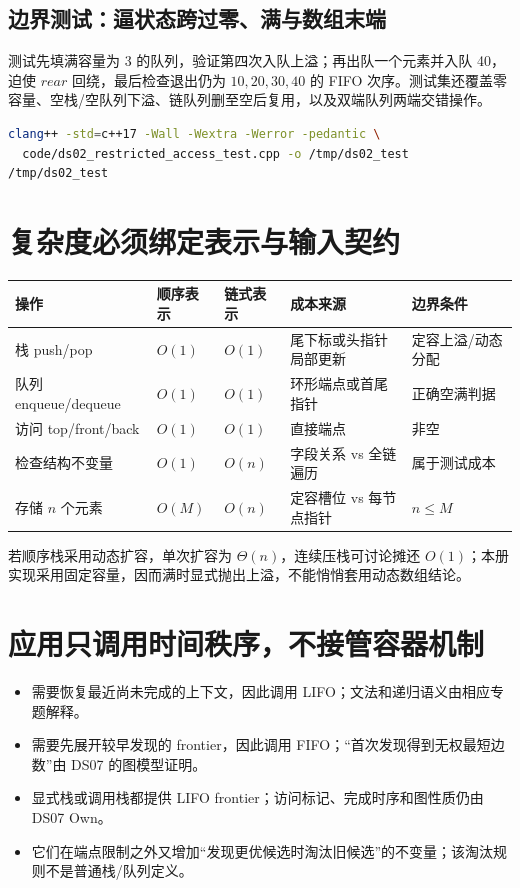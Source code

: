 \documentclass[UTF8,fontset=none,11pt,a4paper]{ctexart}
\begin{document}
\subsection{边界测试：逼状态跨过零、满与数组末端}


测试先填满容量为 3 的队列，验证第四次入队上溢；再出队一个元素并入队 40，迫使 $rear$ 回绕，最后检查退出仍为 $10,20,30,40$ 的 FIFO 次序。测试集还覆盖零容量、空栈/空队列下溢、链队列删至空后复用，以及双端队列两端交错操作。

\begin{lstlisting}[language=bash]
clang++ -std=c++17 -Wall -Wextra -Werror -pedantic \
  code/ds02_restricted_access_test.cpp -o /tmp/ds02_test
/tmp/ds02_test
\end{lstlisting}

\section{复杂度必须绑定表示与输入契约}
\begin{center}\small
\begin{tabularx}{\linewidth}{L{2.4cm}C{1.8cm}C{1.8cm}YY}
\toprule
操作 & 顺序表示 & 链式表示 & 成本来源 & 边界条件\\
\midrule
栈 push/pop & $O(1)$ & $O(1)$ & 尾下标或头指针局部更新 & 定容上溢/动态分配\\
队列 enqueue/dequeue & $O(1)$ & $O(1)$ & 环形端点或首尾指针 & 正确空满判据\\
访问 top/front/back & $O(1)$ & $O(1)$ & 直接端点 & 非空\\
检查结构不变量 & $O(1)$ & $O(n)$ & 字段关系 vs 全链遍历 & 属于测试成本\\
存储 $n$ 个元素 & $O(M)$ & $O(n)$ & 定容槽位 vs 每节点指针 & $n\le M$\\
\bottomrule
\end{tabularx}
\end{center}
若顺序栈采用动态扩容，单次扩容为 $\Theta(n)$，连续压栈可讨论摊还 $O(1)$；本册实现采用固定容量，因而满时显式抛出上溢，不能悄悄套用动态数组结论。

\section{应用只调用时间秩序，不接管容器机制}
\begin{itemize}
\item {}需要恢复最近尚未完成的上下文，因此调用 LIFO；文法和递归语义由相应专题解释。
\item {}需要先展开较早发现的 frontier，因此调用 FIFO；“首次发现得到无权最短边数”由 DS07 的图模型证明。
\item \kw{DFS：}显式栈或调用栈都提供 LIFO frontier；访问标记、完成时序和图性质仍由 DS07 Own。
\item \kw{单调栈/单调队列：}它们在端点限制之外又增加“发现更优候选时淘汰旧候选”的不变量；该淘汰规则不是普通栈/队列定义。
\end{itemize}
\end{document}
